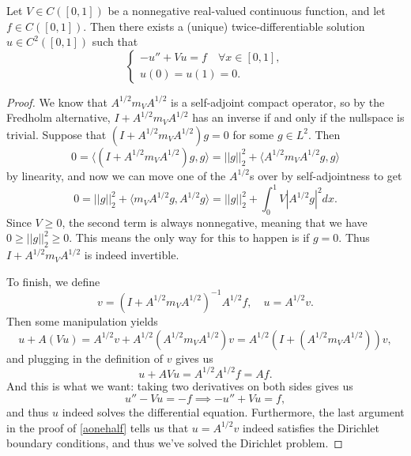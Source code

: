 \begin{theorem}
Let $V \in C([0, 1])$ be a nonnegative real-valued continuous function, and let $f \in C([0, 1])$. Then there exists a (unique) twice-differentiable solution $u \in C^2([0, 1])$ such that
\[
\begin{cases} -u'' + Vu = f \quad \forall x \in [0, 1], \\ u(0) = u(1) = 0. \end{cases}
\]
\end{theorem}
\begin{proof}
We know that $A^{1/2} m_V A^{1/2}$ is a self-adjoint compact operator, so by the Fredholm alternative, $I + A^{1/2} m_V A^{1/2}$ has an inverse if and only if the nullspace is trivial. Suppose that $(I + A^{1/2} m_V A^{1/2}) g = 0$ for some $g \in L^2$. Then 
\[
    0 = \langle (I + A^{1/2} m_V A^{1/2})g, g \rangle = ||g||^2_2 + \langle A^{1/2} m_V A^{1/2} g, g \rangle
\]
by linearity, and now we can move one of the $A^{1/2}$s over by self-adjointness to get 
\[
    0 = ||g||^2_2 + \langle m_V A^{1/2}g, A^{1/2} g \rangle = ||g||^2_2 + \int_0^1 V |A^{1/2} g|^2 dx.
\]
Since $V \ge 0$, the second term is always nonnegative, meaning that we have $0 \ge ||g||^2_2 \ge 0$. This means the only way for this to happen is if $g = 0$. Thus $I + A^{1/2} m_V A^{1/2}$ is indeed invertible. 

To finish, we define 
\[
    v = (I + A^{1/2} m_V A^{1/2})^{-1} A^{1/2} f, \quad u = A^{1/2} v.
\]
Then some manipulation yields
\[
    u + A(Vu) = A^{1/2} v + A^{1/2}(A^{1/2} m_V A^{1/2}) v = A^{1/2}(I + (A^{1/2}m_VA^{1/2}))v,
\]
and plugging in the definition of $v$ gives us
\[
    u + AVu = A^{1/2} A^{1/2} f = Af.
\]
And this is what we want: taking two derivatives on both sides gives us 
\[
    u'' - Vu = -f \implies -u'' + Vu = f,
\]
and thus $u$ indeed solves the differential equation. Furthermore, the last argument in the proof of \cref{aonehalf} tells us that $u = A^{1/2} v$ indeed satisfies the Dirichlet boundary conditions, and thus we've solved the Dirichlet problem. 
\end{proof}